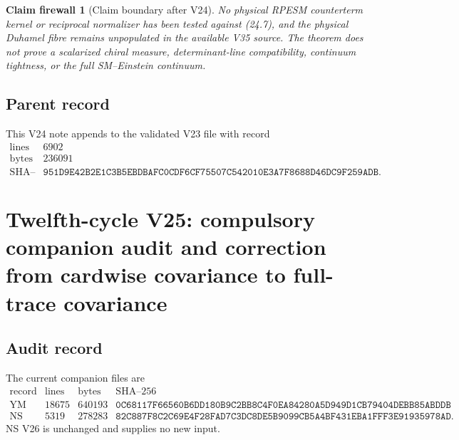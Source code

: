 \documentclass[11pt]{article}
\newtheorem{firewall}[theorem]{Claim firewall}
\theoremstyle{remark}
\begin{document}
\begin{firewall}[Claim boundary after V24]
\label{fire:v12v24-claim}
No physical RPESM counterterm kernel or reciprocal normalizer has
been tested against (24.7), and the physical Duhamel fibre remains
unpopulated in the available V35 source.  The theorem does not prove
a scalarized chiral measure, determinant-line compatibility,
continuum tightness, or the full SM--Einstein continuum.
\end{firewall}

\subsection{Parent record}

This V24 note appends to the validated V23 file with record
\[
\begin{array}{c|c}
\text{lines}&6902\\
\text{bytes}&236091\\
\text{SHA--256}&
\texttt{951D9E42B2E1C3B5EBDBAFC0CDF6CF75507C542010E3A7F8688D46DC9F259ADB}.
\end{array}
\]


\section{Twelfth-cycle V25: compulsory companion audit and correction
from cardwise covariance to full-trace covariance}
\label{sec:v12v25}

\subsection{Audit record}

The current companion files are
\[
\begin{array}{c|r|r|c}
\text{record}&\text{lines}&\text{bytes}&\text{SHA--256}\\ \hline
\text{YM V47}&18675&640193&
\texttt{0C68117F66560B6DD180B9C2BB8C4F0EA84280A5D949D1CB79404DEBB85ABDDB}\\
\text{NS V26}&5319&278283&
\texttt{82C887F8C2C69E4F28FAD7C3DC8DE5B9099CB5A4BF431EBA1FFF3E91935978AD}.
\end{array}                                                   \tag{25.1}
\]
NS V26 is unchanged and supplies no new input.
\end{document}
